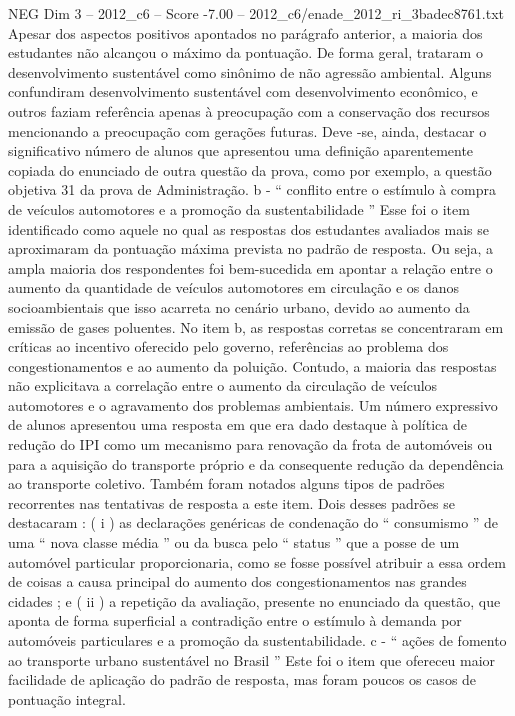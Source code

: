 \begin{textsample}{NEG Dim 3 – 2012\_c6 – Score -7.00 – 2012\_c6/enade\_2012\_ri\_3badec8761.txt}
Apesar dos aspectos positivos apontados no parágrafo anterior, a maioria dos estudantes não alcançou o máximo da pontuação.
De forma geral, trataram o desenvolvimento sustentável como sinônimo de não agressão ambiental.
Alguns confundiram desenvolvimento sustentável com desenvolvimento econômico, e outros faziam referência apenas à preocupação com a conservação dos recursos mencionando a preocupação com gerações futuras.
Deve -se, ainda, destacar o significativo número de alunos que apresentou uma definição aparentemente copiada do enunciado de outra questão da prova, como por exemplo, a questão objetiva 31 da prova de Administração. b - “ conflito entre o estímulo à compra de veículos automotores e a promoção da sustentabilidade ” Esse foi o item identificado como aquele no qual as respostas dos estudantes avaliados mais se aproximaram da pontuação máxima prevista no padrão de resposta.
Ou seja, a ampla maioria dos respondentes foi bem-sucedida em apontar a relação entre o aumento da quantidade de veículos automotores em circulação e os danos socioambientais que isso acarreta no cenário urbano, devido ao aumento da emissão de gases poluentes.
No item b, as respostas corretas se concentraram em críticas ao incentivo oferecido pelo governo, referências ao problema dos congestionamentos e ao aumento da poluição.
Contudo, a maioria das respostas não explicitava a correlação entre o aumento da circulação de veículos automotores e o agravamento dos problemas ambientais.
Um número expressivo de alunos apresentou uma resposta em que era dado destaque à política de redução do IPI como um mecanismo para renovação da frota de automóveis ou para a aquisição do transporte próprio e da consequente redução da dependência ao transporte coletivo.
Também foram notados alguns tipos de padrões recorrentes nas tentativas de resposta a este item.
Dois desses padrões se destacaram : ( i ) as declarações genéricas de condenação do “ consumismo ” de uma “ nova classe média ” ou da busca pelo “ status ” que a posse de um automóvel particular proporcionaria, como se fosse possível atribuir a essa ordem de coisas a causa principal do aumento dos congestionamentos nas grandes cidades ; e ( ii ) a repetição da avaliação, presente no enunciado da questão, que aponta de forma superficial a contradição entre o estímulo à demanda por automóveis particulares e a promoção da sustentabilidade. c - “ ações de fomento ao transporte urbano sustentável no Brasil ” Este foi o item que ofereceu maior facilidade de aplicação do padrão de resposta, mas foram poucos os casos de pontuação integral.

\end{textsample}
